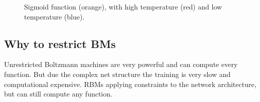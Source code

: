 \begin{figure}
\centering
{}
\caption{Sigmoid function (orange), with high temperature (red) and low temperature (blue).}
\label{fig:bm-simulated-annealing}
\end{figure}

\subsection{Why to restrict BMs}
Unrestricted Boltzmann machines are very powerful and can compute every function. But due the complex net structure the training is very slow and computational expensive. \Glspl{RBM} applying constraints to the network architecture, but can still compute any function.


